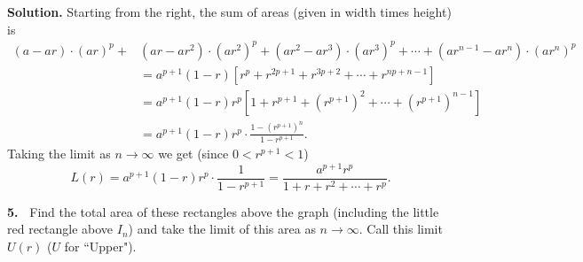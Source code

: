 \documentclass[12pt]{article}
\theoremstyle{definition}
\theoremstyle{remark}
\theoremstyle{definition}
\newenvironment{Solution}{\noindent\textbf{Solution.}}{}
\begin{document}
\begin{Solution} Starting from the right, the sum of areas (given in width times height) is 
\[\begin{split}(a-ar)\cdot(ar)^p+&(ar-ar^2)\cdot (ar^2)^p+(ar^2-ar^3)\cdot (ar^3)^p+\cdots+(ar^{n-1}-ar^n)\cdot (ar^n)^p\\
&=a^{p+1}(1-r)\left[r^p+r^{2p+1}+r^{3p+2}+\cdots+r^{np+n-1}\right]\\
&=a^{p+1}(1-r)r^p\left[1+r^{p+1}+\left(r^{p+1}\right)^2+\cdots+
\left(r^{p+1}\right)^{n-1}\right]\\
&=a^{p+1}(1-r)r^p\cdot\frac{1-\left(r^{p+1}\right)^n}{1-r^{p+1}}.
\end{split}
\]
Taking the limit as $n\to \infty$ we get (since $0<r^{p+1}<1$) 
\[
L(r)=a^{p+1}(1-r)r^p\cdot\frac{1}{1-r^{p+1}}=
\frac{a^{p+1}r^p}{1+r+r^2+\cdots +r^p}.
\]


\end{Solution}


{\bf 5.\ } Find the total area of these rectangles above the graph (including the little red rectangle above $I_n$) and take the limit of this area as $n\to\infty$. Call this limit $U(r)$ ($U$ for ``Upper").
\end{document}
